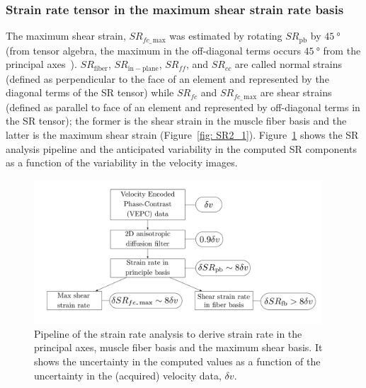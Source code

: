 \subsubsection{Strain rate tensor in the maximum shear strain rate basis}
The maximum shear strain, $SR_{fc\_\,\mathrm{max}}$ was estimated by rotating $SR_{\mathrm{pb}}$ by $\SI{45}{\degree}$ (from tensor algebra, the maximum in the off-diagonal terms occurs $\SI{45}{\degree}$ from the principal axes~\cite{RNSS12}).
$SR_{\mathrm{fiber}}$, $SR_{\mathrm{in-plane}}$, $SR_{ff}$, and $SR_{cc}$ are called normal strains (defined as perpendicular to the face of an element and represented by the diagonal terms of the SR tensor) while $SR_{fc}$ and $SR_{fc\_\,\mathrm{max}}$ are shear strains (defined as parallel to face of an element and represented by off-diagonal terms in the SR tensor); the former is the shear strain in the muscle fiber basis and the latter is the maximum shear strain (Figure~\ref{fig: SR2_1}). 
Figure~\ref{fig: SR2_S1} shows the SR analysis pipeline and the anticipated variability in the computed SR components as a function of the variability in the velocity images.
\begin{figure}[!htb]
\vspace{+0.2cm}
\centering
\includegraphics[width=0.96\textwidth]{Figures/SRYO_error.pdf}
\caption[Pipeline of the strain rate analysis with associated uncertainties in the computed values]{Pipeline of the strain rate analysis to derive strain rate in the principal axes, muscle fiber basis and the maximum shear basis. It shows the uncertainty in the computed values as a function of the uncertainty in the (acquired) velocity data, $\delta v$.}
\label{fig: SR2_S1}
\end{figure}
